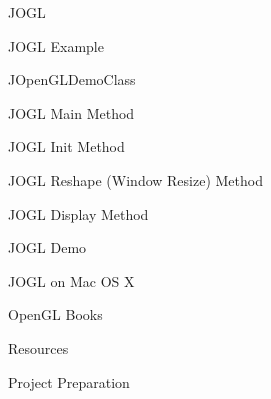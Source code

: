 \documentclass[xcolor=dvipsnames,t]{beamer}
\begin{document}
\begin{frame}{JOGL} 
\end{frame} 

\begin{frame}{JOGL Example} 
\end{frame} 

\begin{frame}{JOpenGLDemoClass}
\end{frame} 

\begin{frame}{JOGL Main Method} 
\end{frame} 

\begin{frame}{JOGL Init Method} 
\end{frame} 

\begin{frame}{JOGL Reshape (Window Resize) Method} 
\end{frame}

\begin{frame}{JOGL Display Method} 
\end{frame} 

\begin{frame}{JOGL Demo} 
\end{frame} 

\begin{frame}{JOGL on Mac OS X} 
\end{frame} 

\begin{frame}{OpenGL Books} 
\end{frame} 

\begin{frame}{Resources} 
\end{frame} 

\begin{frame}{Project Preparation} 
\end{frame} 
\end{document}
